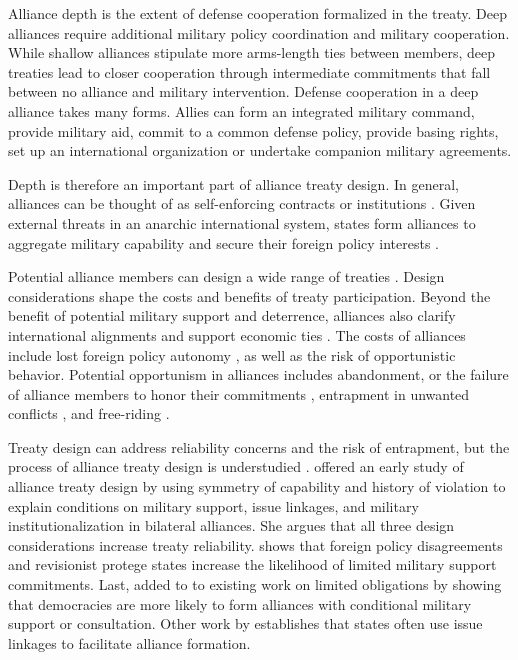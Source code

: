 \documentclass[12pt]{article}
\begin{document}
Alliance depth is the extent of defense cooperation formalized in the treaty. 
Deep alliances require additional military policy coordination and military cooperation. 
While shallow alliances stipulate more arms-length ties between members, deep treaties lead to closer cooperation through intermediate commitments that fall between no alliance and military intervention. 
Defense cooperation in a deep alliance takes many forms. 
Allies can form an integrated military command, provide military aid, commit to a common defense policy, provide basing rights, set up an international organization or undertake companion military agreements. 


Depth is therefore an important part of alliance treaty design.
In general, alliances can be thought of as self-enforcing contracts or institutions \citep{Leedsetal2002, Morrow2000}.
Given external threats in an anarchic international system, states form alliances to aggregate military capability and secure their foreign policy interests \citep{Altfield1984, Smith1995, Snyder1997, FordhamPoast2014}. 


Potential alliance members can design a wide range of treaties \citep{Leedsetal2000, Leedsetal2002, Benson2012, BensonClinton2016}. 
Design considerations shape the costs and benefits of treaty participation. 
Beyond the benefit of potential military support and deterrence, alliances also clarify international alignments \citep{Snyder1990} and support economic ties \citep{Gowa1995, Li2003, Long2003, Fordham2010, WolfordKim2017}. 
The costs of alliances include lost foreign policy autonomy \citep{Altfield1984, Morrow2000, Johnson2015}, as well as the risk of opportunistic behavior. 
Potential opportunism in alliances includes abandonment, or the failure of alliance members to honor their commitments \citep{BerkemeierFuhrmann2018}, entrapment in unwanted conflicts \citep{Snyder1984}, and free-riding \citep{Morrow2000}.   


Treaty design can address reliability concerns and the risk of entrapment, but the process of alliance treaty design is understudied \citep{Poast2019a}. 
\citet{Mattes2012} offered an early study of alliance treaty design by using symmetry of capability and history of violation to explain conditions on military support, issue linkages, and military institutionalization in bilateral alliances. 
She argues that all three design considerations increase treaty reliability. 
\citet{Benson2012} shows that foreign policy disagreements and revisionist protege states increase the likelihood of limited military support commitments. 
Last, \citep{Chibaetal2015} added to to existing work on limited obligations by showing that democracies are more likely to form alliances with conditional military support or consultation. 
Other work by \citet{Poast2012, Poast2013} establishes that states often use issue linkages to facilitate alliance formation. 
\end{document}
